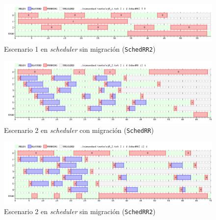 \begin{figure}[H]
    \begin{center}
        \includegraphics[width=1\columnwidth]{imagenes/ej8_1_rr2.png}
        \caption{Escenario 1 en \emph{scheduler} sin migración (\texttt{SchedRR2})}
    \end{center}
\end{figure}

\begin{figure}[H]
    \begin{center}
        \includegraphics[width=1\columnwidth]{imagenes/ej8_2_rr.png}
        \caption{Escenario 2 en \emph{scheduler} con migración (\texttt{SchedRR})}
    \end{center}
\end{figure}

\begin{figure}[H]
    \begin{center}
        \includegraphics[width=1\columnwidth]{imagenes/ej8_2_rr2.png}
        \caption{Escenario 2 en \emph{scheduler} sin migración (\texttt{SchedRR2})}
    \end{center}
\end{figure}
